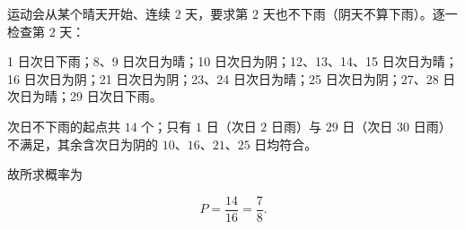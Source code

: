 \begin{answer}
运动会从某个晴天开始、连续 $2$ 天，要求第 $2$ 天也不下雨（阴天不算下雨）。逐一检查第 $2$ 天：

1 日次日下雨；8、9 日次日为晴；10 日次日为阴；12、13、14、15 日次日为晴；16 日次日为阴；21 日次日为阴；23、24 日次日为晴；25 日次日为阴；27、28 日次日为晴；29 日次日下雨。

次日不下雨的起点共 $14$ 个；只有 $1$ 日（次日 $2$ 日雨）与 $29$ 日（次日 $30$ 日雨）不满足，其余含次日为阴的 $10$、$16$、$21$、$25$ 日均符合。

故所求概率为

\nopagebreak[4]
\[
P=\frac{14}{16}=\frac{7}{8}.
\]



\end{answer}

